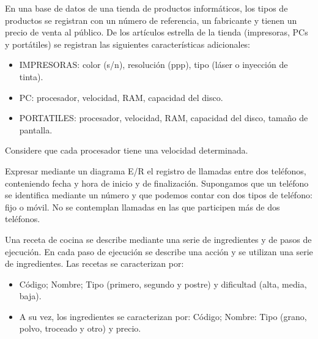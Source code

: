 \begin{ejercicio} \label{ej:8}
    En una base de datos de una tienda de productos informáticos, los tipos de productos se registran con un
    número de referencia, un fabricante y tienen un precio de venta al público. De los artículos estrella de la tienda
    (impresoras, PCs y portátiles) se registran las siguientes características adicionales:
    \begin{itemize}
        \item IMPRESORAS: color (s/n), resolución (ppp), tipo (láser o inyección de tinta).
        \item PC: procesador, velocidad, RAM, capacidad del disco.
        \item PORTATILES: procesador, velocidad, RAM, capacidad del disco, tamaño de pantalla.
    \end{itemize}
    Considere que cada procesador tiene una velocidad determinada.
\end{ejercicio}

\begin{ejercicio} \label{ej:9}
    Expresar mediante un diagrama E/R el registro de llamadas entre dos teléfonos, conteniendo fecha y hora de
    inicio y de finalización. Supongamos que un teléfono se identifica mediante un número y que podemos contar
    con dos tipos de teléfono: fijo o móvil. No se contemplan llamadas en las que participen más de dos teléfonos.
\end{ejercicio}

\begin{ejercicio} \label{ej:10}
    Una receta de cocina se describe mediante una serie de ingredientes y de pasos de ejecución. En cada paso
    de ejecución se describe una acción y se utilizan una serie de ingredientes. Las recetas se caracterizan por:
    \begin{itemize}
        \item Código; Nombre; Tipo (primero, segundo y postre) y dificultad (alta, media, baja).
        \item A su vez, los ingredientes se caracterizan por: Código; Nombre: Tipo (grano, polvo, troceado y otro) y precio.
    \end{itemize}
\end{ejercicio}

